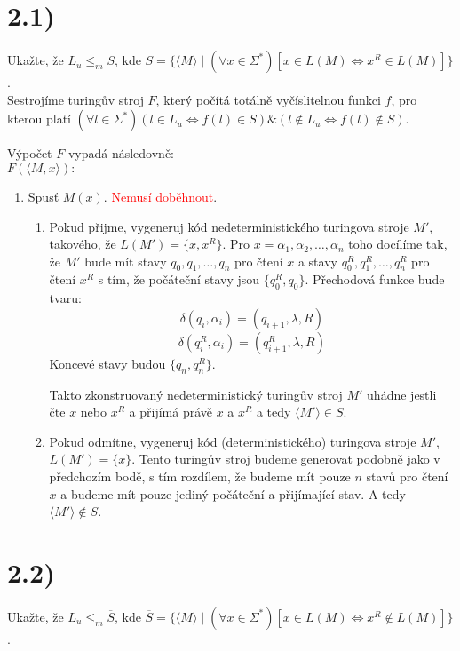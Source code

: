 \documentclass{article}
\begin{document}
\section*{2.1)}
Ukažte, že $L_u \leq_m S$, kde $S=\{\langle M \rangle \mid
(\forall x \in \Sigma^*)
[x \in L(M) \Leftrightarrow x^R \in L(M)]\}$.\\

Sestrojíme turingův stroj $F$, který počítá totálně vyčíslitelnou funkci $f$,
pro kterou platí $(\forall l \in \Sigma^*) (l \in L_u \Leftrightarrow f(l) \in
S) \& (l \notin L_u \Leftrightarrow f(l) \notin S)$.

Výpočet $F$ vypadá následovně:\\
$ F(\langle M, x \rangle):$
\begin{enumerate}
  \item Spusť $M(x)$. \textcolor{red}{Nemusí doběhnout}.
  \begin{enumerate}
    \item Pokud přijme, vygeneruj kód nedeterministického turingova stroje $M'$,
    takového, že $L(M') = \{x, x^R\}$. Pro $x=\alpha_1, \alpha_2, \ldots,
    \alpha_n$ toho docílíme tak, že $M'$ bude mít stavy $q_0, q_1, \ldots, q_n$
    pro čtení $x$ a stavy $q_0^R, q_1^R, \ldots, q_n^R$ pro čtení $x^R$ s tím, že
    počáteční stavy jsou $\{q_0^R, q_0\}$. Přechodová funkce bude tvaru:
    $$\delta(q_i, \alpha_i) = (q_{i+1}, \lambda, R)$$
    $$\delta(q_i^R, \alpha_i) = (q_{i+1}^R, \lambda, R)$$
    Koncevé stavy budou $\{q_n, q_n^R\}$.

    Takto zkonstruovaný nedeterministický turingův stroj $M'$ uhádne jestli čte
    $x$ nebo $x^R$ a přijímá právě $x$ a $x^R$ a tedy $\langle M' \rangle \in S$.

    \item Pokud odmítne, vygeneruj kód (deterministického) turingova stroje
    $M'$, $L(M') = \{x\}$. Tento turingův stroj budeme generovat podobně jako
    v předchozím bodě, s tím rozdílem, že budeme mít pouze $n$ stavů pro čtení
    $x$ a budeme mít pouze jediný počáteční a přijímající stav. A tedy
    $\langle M' \rangle \notin S$.
  \end{enumerate}
  
\end{enumerate}


\section*{2.2)}
Ukažte, že $L_u \leq_m \overline{S}$, kde $\overline{S} = \{\langle M \rangle
\mid (\forall x \in \Sigma^*) [x \in L(M) \Leftrightarrow x^R \notin L(M)]\}$.\\
\end{document}
